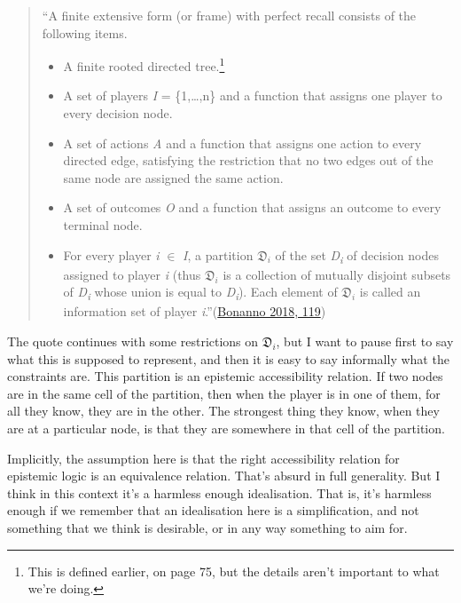 \documentclass[
  12pt,
  letterpaper,
  DIV=11,
  numbers=noendperiod]{scrreprt}
\providecommand{\tightlist}{%
  \setlength{\itemsep}{0pt}\setlength{\parskip}{0pt}}\usepackage{longtable,booktabs,array}
\begin{document}
\begin{quote}
``A finite extensive form (or frame) with perfect recall consists of the
following items.

\begin{itemize}
\tightlist
\item
  A finite rooted directed tree.\footnote{This is defined earlier, on
    page 75, but the details aren't important to what we're doing.}
\item
  A set of players \emph{I} = \{1,\ldots,n\} and a function that assigns
  one player to every decision node.
\item
  A set of actions \emph{A} and a function that assigns one action to
  every directed edge, satisfying the restriction that no two edges out
  of the same node are assigned the same action.
\item
  A set of outcomes \emph{O} and a function that assigns an outcome to
  every terminal node.
\item
  For every player \emph{i} \(\in\) \emph{I}, a partition
  \(\mathfrak{D}_i\) of the set \emph{D\textsubscript{i}} of decision
  nodes assigned to player \emph{i} (thus \(\mathfrak{D}_i\) is a
  collection of mutually disjoint subsets of \emph{D\textsubscript{i}}
  whose union is equal to \emph{D\textsubscript{i}}). Each element of
  \(\mathfrak{D}_i\) is called an information set of player
  \emph{i}.''(\protect\hyperlink{ref-Bonanno2018}{Bonanno 2018, 119})
\end{itemize}
\end{quote}

The quote continues with some restrictions on \(\mathfrak{D}_i\), but I
want to pause first to say what this is supposed to represent, and then
it is easy to say informally what the constraints are. This partition is
an epistemic accessibility relation. If two nodes are in the same cell
of the partition, then when the player is in one of them, for all they
know, they are in the other. The strongest thing they know, when they
are at a particular node, is that they are somewhere in that cell of the
partition.

Implicitly, the assumption here is that the right accessibility relation
for epistemic logic is an equivalence relation. That's absurd in full
generality. But I think in this context it's a harmless enough
idealisation. That is, it's harmless enough if we remember that an
idealisation here is a simplification, and not something that we think
is desirable, or in any way something to aim for.
\end{document}

